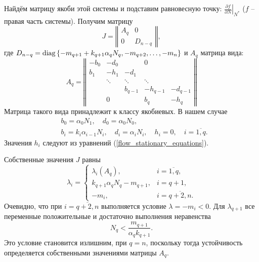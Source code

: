     Найдём матрицу якоби этой системы и подставим равновесную точку: \( \left.\frac{\partial f}{\partial N}\right|_{N^*} \) (\(f\) -- правая часть системы). Получим матрицу
    \begin{equation} \label{flow_jacobian_small}
        J = \left\Vert \begin{matrix}
            A_q & 0 \\
            0 & D_{n-q}
        \end{matrix} \right\Vert,
    \end{equation}
    где \(D_{n-q} = \operatorname{diag}\left\{ -m_{q+1} + k_{q+1} \alpha_q N_q, -m_{q+2}, \ldots, -m_{n} \right\}\) и \(A_q\) матрица вида:
    \begin{equation} \label{flow_jacobian_big}
        A_q = \left\Vert \begin{matrix}
                -b_0  & -d_0   &          &     0    & \\
                b_1  & -h_1   &  -d_1    &          & \\
                        & \ddots & \ddots   &  \ddots  &          \\
                        &        & b_{q-1}  & -h_{q-1} & -d_{q-1} \\
                        &   0    &          & b_{q}    & -h_{q}  
        \end{matrix} \right\Vert
    \end{equation}
    Матрица такого вида принадлежит к классу якобиевых. В нашем случае 
    \begin{equation} \label{flow_jacobian_vars}
        \begin{split}
            & b_0 = \alpha_0 N_1, \quad d_0 = \alpha_0 N_0, \\
            & b_i = k_i \alpha_{i-1} N_i, \quad d_i = \alpha_i N_i, \quad h_i = 0, \quad i=\overline{1,q}.
        \end{split}
    \end{equation}
    Значения \(h_i\) следуют из уравнений (\ref{flow_stationary_equations}).


    Собственные значения \(J\) равны
    \begin{equation} \label{flow_jacobian_spectrum}
        \lambda_i = \left\{ \begin{matrix}
            \lambda_i (A_q), & i=\overline{1,q}, \\
            k_{q+1} \alpha_q N_q - m_{q+1}, & i=q+1, \\
            -m_i, & i=\overline{q+2, n}. 
        \end{matrix} \right.
    \end{equation}
    Очевидно, что при \(i = \overline{q+2,n}\) выполняется условие \(\lambda = -m_i < 0\). Для \(\lambda_{q+1}\) все переменные положительные и достаточно выполнения неравенства
    \begin{equation} \label{flow_nq_upper}
        N_q < \frac{m_{q+1}}{\alpha_q k_{q+1}}.
    \end{equation}
    Это условие становится излишним, при \(q = n\), поскольку тогда устойчивость определяется собственными значениями матрицы \(A_q\).

